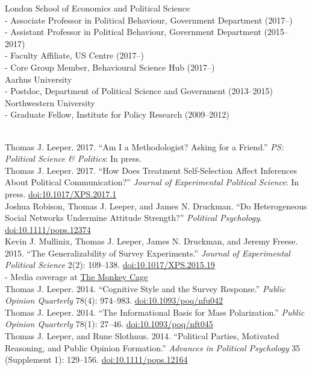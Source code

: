 \documentclass[12pt]{article}
\renewcommand{\section}[1]{\pagebreak[3]%
    \llap{\scshape\smash{\parbox[t]{\marginparwidth}{\raggedright {\color{lg}#1}}}}%
    \vspace{-\baselineskip}\par}
\newcommand{\topic}[1]{\pagebreak[3]\indent {\color{lg}{\footnotesize #1 }}\\}
\newcommand{\entry}[1]{\indent {\color{lg}\guillemotright}\hspace{2pt}#1\vspace{.25em}\\}
\newcommand{\subentry}[1]{{\color{lg}-} #1\vspace{.25em}\\}
\begin{document}
\section{Academic Appointments}
\entry{London School of Economics and Political Science}
    \subentry{Associate Professor in Political Behaviour, Government Department (2017--)}
    \subentry{Assistant Professor in Political Behaviour, Government Department (2015--2017)}
    \subentry{Faculty Affiliate, US Centre (2017--)}
    \subentry{Core Group Member, Behavioural Science Hub (2017--)}
\entry{Aarhus University}
    \subentry{Postdoc, Department of Political Science and Government (2013--2015)}
\entry{Northwestern University}
    \subentry{Graduate Fellow, Institute for Policy Research (2009--2012)}

\section{Publications}
\topic{Peer-Reviewed Publications: Political Science}
    \entry{Thomas J. Leeper. 2017. ``Am I a Methodologist? Asking for a Friend.'' \textit{PS: Political Science \& Politics}: In press.}
	\entry{Thomas J. Leeper. 2017. ``How Does Treatment Self-Selection Affect Inferences About Political Communication?'' \textit{Journal of Experimental Political Science}: In press. \href{http://doi.org/10.1017/XPS.2017.1}{doi:10.1017/XPS.2017.1}}
    \entry{Joshua Robison, Thomas J. Leeper, and James N. Druckman. ``Do Heterogeneous Social Networks Undermine Attitude Strength?'' \textit{Political Psychology}. \href{http://doi.org/10.1111/pops.12374}{doi:10.1111/pops.12374}}
	\entry{Kevin J. Mullinix, Thomas J. Leeper, James N. Druckman, and Jeremy Freese. 2015. ``The Generalizability of Survey Experiments.'' \textit{Journal of Experimental Political Science} 2(2): 109--138. \href{http://doi.org/10.1017/XPS.2015.19}{doi:10.1017/XPS.2015.19}}
		\subentry{Media coverage at \href{https://www.washingtonpost.com/news/monkey-cage/wp/2016/03/09/does-social-science-have-a-replication-crisis/}{The Monkey Cage}}
	\entry{Thomas J. Leeper. 2014. ``Cognitive Style and the Survey Response.'' \textit{Public Opinion Quarterly} 78(4): 974--983. \href{http://doi.org/10.1093/poq/nfu042}{doi:10.1093/poq/nfu042}}
	\entry{Thomas J. Leeper. 2014. ``The Informational Basis for Mass Polarization.'' \textit{Public Opinion Quarterly} 78(1): 27--46. \href{http://doi.org/10.1093/poq/nft045}{doi:10.1093/poq/nft045}}
	\entry{Thomas J. Leeper, and Rune Slothuus. 2014. ``Political Parties, Motivated Reasoning, and Public Opinion Formation.'' \textit{Advances in Political Psychology} 35 (Supplement 1): 129--156. \href{http://doi.org/10.1111/pops.12164}{doi:10.1111/pops.12164}}
\end{document}
